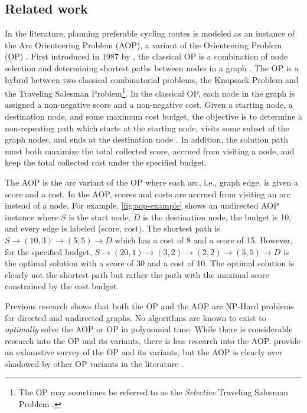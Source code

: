 \documentclass[honors]{union-cs-thesis}
\begin{document}
\subsection{Related work} \label{sec:relatedwork}
In the literature, planning preferable cycling routes is modeled as an instance of the Arc Orienteering Problem (AOP), a variant of the Orienteering Problem (OP) \cite{souffriau2011planning}. First introduced in 1987 by \citeauthor{golden1987orienteering}, the classical OP is a combination of node selection and determining shortest paths between nodes in a graph \cite{golden1987orienteering}. The OP is a hybrid between two classical combinatorial problems, the Knapsack Problem and the Traveling Salesman Problem\footnote{The OP may sometimes be referred to as the \emph{Selective} Traveling Salesman Problem \cite{laporte1990selective}.}. In the classical OP, each node in the graph is assigned a non-negative score and a non-negative cost. Given a starting node, a destination node, and some maximum cost budget, the objective is to determine a non-repeating path which starts at the starting node, visits some subset of the graph nodes, and ends at the destination node \cite{gunawan2016orienteering}. In addition, the solution path must both maximize the total collected score, accrued from visiting a node, and keep the total collected cost under the specified budget.

The AOP is the arc variant of the OP where each arc, i.e., graph edge, is given a score and a cost. In the AOP, scores and costs are accrued from visiting an arc instead of a node. For example, \cref{fig:aop-example} shows an undirected AOP instance where $S$ is the start node, $D$ is the destination node, the budget is 10, and every edge is labeled (score, cost). The shortest path is $S \rightarrow (10,3) \rightarrow (5,5) \rightarrow D$ which has a cost of 8 and a score of 15. However, for the specified budget, $S \rightarrow (20,1) \rightarrow (3,2) \rightarrow (2,2) \rightarrow (5,5) \rightarrow D$ is the optimal solution with a score of 30 and a cost of 10. The optimal solution is clearly not the shortest path but rather the path with the maximal score constrained by the cost budget.

Previous research shows that both the OP and the AOP are NP-Hard problems for directed and undirected graphs. No algorithms are known to exist to \emph{optimally} solve the AOP or OP in polynomial time. While there is considerable research into the OP and its variants, there is less research into the AOP. \citeauthor{gunawan2016orienteering} provide an exhaustive survey of the OP and its variants, but the AOP is clearly over shadowed by other OP variants in the literature \cite{gunawan2016orienteering}.
\end{document}
